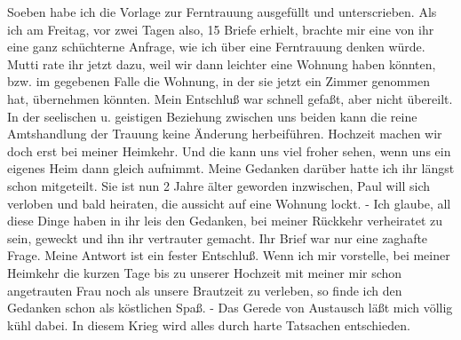 \def\day{6. Februar 1944}
\mktitle

Soeben habe ich die Vorlage zur Ferntrauung ausgef\"{u}llt und unterscrieben.
Als ich am Freitag, vor zwei Tagen also, 15 Briefe erhielt, brachte mir eine von ihr eine ganz sch\"{u}chterne Anfrage, wie ich \"{u}ber eine Ferntrauung denken w\"{u}rde.
Mutti rate ihr jetzt dazu, weil wir dann leichter eine Wohnung haben k\"{o}nnten, bzw. im gegebenen Falle die Wohnung, in der sie jetzt ein Zimmer genommen hat, \"{u}bernehmen k\"{o}nnten.
Mein Entschlu{\ss} war schnell gefa{\ss}t, aber nicht \"{u}bereilt.
In der seelischen u. geistigen Beziehung zwischen uns beiden kann die reine Amtshandlung der Trauung keine \"{A}nderung herbeif\"{u}hren.
Hochzeit machen wir doch erst bei meiner Heimkehr.
Und die kann uns viel froher sehen, wenn uns ein eigenes Heim dann gleich aufnimmt.
Meine Gedanken dar\"{u}ber hatte ich ihr l\"{a}ngst schon mitgeteilt.
Sie ist nun 2 Jahre \"{a}lter geworden inzwischen, Paul will sich verloben und bald heiraten, die aussicht auf eine Wohnung lockt.
- Ich glaube, all diese Dinge haben in ihr leis den Gedanken, bei meiner R\"{u}ckkehr verheiratet zu sein, geweckt und ihn ihr vertrauter gemacht.
Ihr Brief war nur eine zaghafte Frage.
Meine Antwort ist ein fester Entschlu{\ss}.
Wenn ich mir vorstelle, bei meiner Heimkehr die kurzen Tage bis zu unserer Hochzeit mit meiner mir schon angetrauten Frau noch als unsere Brautzeit zu verleben, so finde ich den Gedanken schon als k\"{o}stlichen Spa{\ss}.
- Das Gerede von Austausch l\"{a}{\ss}t mich v\"{o}llig k\"{u}hl dabei.
In diesem Krieg wird alles durch harte Tatsachen entschieden.

\clearpage

